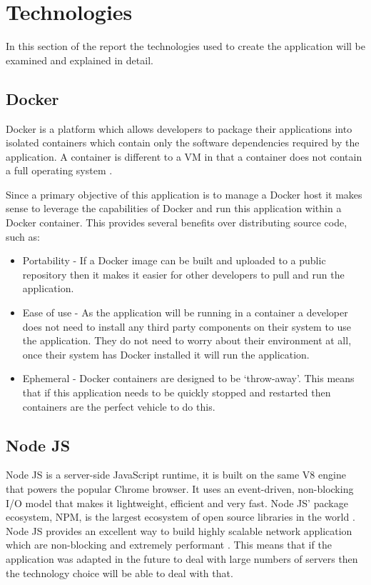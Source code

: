 \section{Technologies}
\label{sec:technologies}
In this section of the report the technologies used to create the application will be examined and explained in detail.
\subsection{Docker}
\gls{Docker} is a platform which allows developers to package their applications into isolated containers which contain only the software dependencies required by the application. A container is different to a \gls{VM} in that a container does not contain a full operating system \citep{WhatDocker}.

Since a primary objective of this application is to manage a \gls{Docker host} it makes sense to leverage the capabilities of Docker and run this application within a \gls{Docker container}. This provides several benefits over distributing source code, such as:

\begin{itemize}
	\item Portability - If a \gls{Docker image} can be built and uploaded to a public repository then it makes it easier for other developers to pull and run the application.
	\item Ease of use - As the application will be running in a container a developer does not need to install any third party components on their system to use the application. They do not need to worry about their environment at all, once their system has Docker installed it will run the application.
	\item Ephemeral - Docker containers are designed to be `throw-away'. This means that if this application needs to be quickly stopped and restarted then containers are the perfect vehicle to do this.
\end{itemize}

\subsection{Node JS}
\label{sub:nodejs}
Node JS is a server-side JavaScript runtime, it is built on the same V8 engine that powers the popular Chrome browser. It uses an event-driven, non-blocking I/O model that makes it lightweight, efficient and very fast. Node JS' package ecosystem, NPM, is the largest ecosystem of open source libraries in the world \citep{Nodejs.org2016}. Node JS provides an excellent way to build highly scalable network application which are non-blocking and extremely performant \citep{Griffin2011}. This means that if the application was adapted in the future to deal with large numbers of servers then the technology choice will be able to deal with that.

